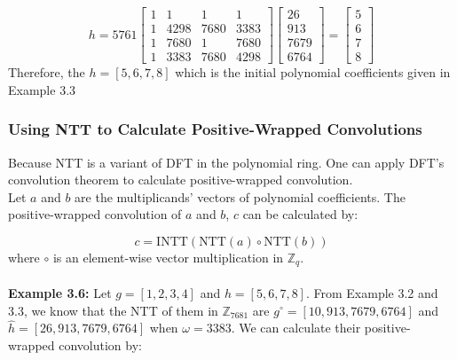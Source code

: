 \documentclass[12pt]{report}
\begin{document}
\[
h = 5761 \begin{bmatrix}
1 & 1 & 1 & 1 \\
1 & 4298 & 7680 & 3383 \\
1 & 7680 & 1 & 7680 \\
1 & 3383 & 7680 & 4298
\end{bmatrix}
\begin{bmatrix}
26 \\
913 \\
7679 \\
6764
\end{bmatrix} = \begin{bmatrix}
5 \\
6 \\
7 \\
8
\end{bmatrix}
\]
Therefore, the $h=[5,6,7,8]$ which is the initial polynomial coefficients given in Example 3.3

\subsubsection{Using NTT to Calculate Positive-Wrapped Convolutions}
Because NTT is a variant of DFT in the polynomial ring. One can apply DFT's convolution theorem to calculate positive-wrapped convolution. \\
Let $a$ and $b$ are the multiplicands' vectors of polynomial coefficients. The positive-wrapped convolution of $a$ and $b$, $c$ can be calculated by:

\[c = \text{INTT}(\text{NTT}(a) \circ \text{NTT}(b))\]
where $\circ$ is an element-wise vector multiplication in $\mathbb{Z}_q$. \\ \\
\textbf{Example 3.6:} Let $g=[1,2,3,4]$ and $h=[5,6,7,8]$. From Example 3.2 and 3.3, we know that the NTT of them in $\mathbb{Z}_{7681}$ are $g^{\circ}=[10,913,7679,6764]$ and $\hat{h}=[26,913,7679,6764]$ when $\omega=3383.$ We can calculate their positive-wrapped convolution by:
\end{document}
